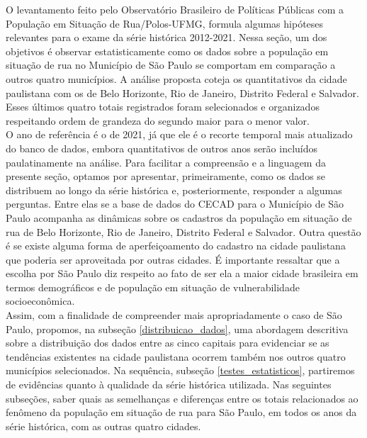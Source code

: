 \documentclass[14pt]{extarticle}
\begin{document}
O levantamento feito pelo Observatório Brasileiro de Políticas Públicas com a População em Situação de Rua/Polos-UFMG, formula algumas hipóteses relevantes para o exame da série histórica 2012-2021. Nessa seção, um dos objetivos é observar estatisticamente como os dados sobre a população em situação de rua no Município de São Paulo se comportam em comparação a outros quatro municípios. A análise proposta coteja os quantitativos da cidade paulistana com os de Belo Horizonte, Rio de Janeiro, Distrito Federal e Salvador. Esses últimos quatro totais registrados foram selecionados e organizados respeitando ordem de grandeza do segundo maior para o menor valor.\\ 

O ano de referência é o de 2021, já que ele é o recorte temporal mais atualizado do banco de dados, embora quantitativos de outros anos serão incluídos paulatinamente na análise. Para facilitar a compreensão e a linguagem da presente seção, optamos por apresentar, primeiramente, como os dados se distribuem ao longo da série histórica e, posteriormente, responder a algumas perguntas. Entre elas se a base de dados do CECAD para o Município de São Paulo acompanha as dinâmicas sobre os cadastros da população em situação de rua de Belo Horizonte, Rio de Janeiro, Distrito Federal e Salvador. Outra questão é se existe alguma forma de aperfeiçoamento do cadastro na cidade paulistana que poderia ser aproveitada por outras cidades. É importante ressaltar que a escolha por São Paulo diz respeito ao fato de ser ela a maior cidade brasileira em termos demográficos e de população em situação de vulnerabilidade socioeconômica.\\

Assim, com a finalidade de compreender mais apropriadamente o caso de São Paulo, propomos, na subseção \ref{distribuicao_dados}, uma abordagem descritiva sobre a distribuição dos dados entre as cinco capitais para evidenciar se as tendências existentes na cidade paulistana ocorrem também nos outros quatro municípios selecionados. Na sequência, subseção \ref{testes_estatisticos}, partiremos de evidências quanto à qualidade da série histórica utilizada. Nas seguintes subseções, saber quais as semelhanças e diferenças entre os totais relacionados ao fenômeno da população em situação de rua para São Paulo, em todos os anos da série histórica, com as outras quatro cidades.\\ 
\end{document}
